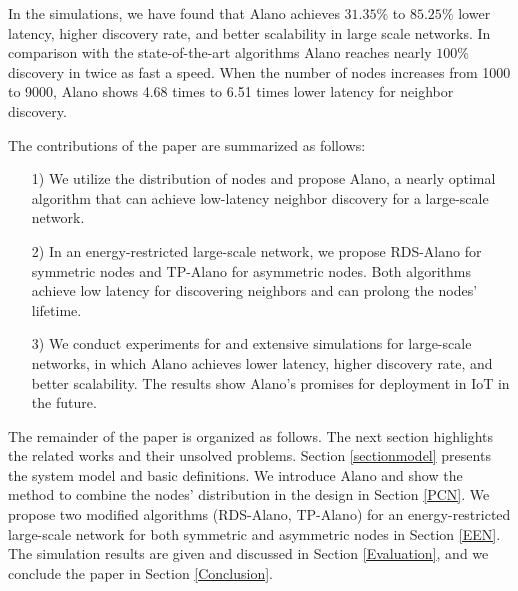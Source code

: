 In the simulations, we have found that Alano achieves $31.35\%$ to $ 85.25\%$
lower latency, higher discovery rate, and better scalability in large
scale networks. %
In comparison with the state-of-the-art algorithms \cite{you2011aloha, sun2014hello, chen2015heterogeneous, bakht2012searchlight}
Alano reaches nearly $100\%$ discovery in twice as fast a speed. 
When the number of nodes increases from 1000 to 9000, 
Alano shows 4.68 times to 6.51 times lower latency for neighbor discovery.

The contributions of the paper are summarized as follows:
\begin{itemize}
\item[1)] We utilize the distribution of nodes and propose Alano, a
nearly optimal algorithm that can achieve low-latency neighbor discovery
for a large-scale network.
\item[2)] In an energy-restricted large-scale network, we propose
RDS-Alano for symmetric nodes and TP-Alano for asymmetric nodes. Both
algorithms achieve low latency for discovering neighbors and can prolong
the nodes' lifetime.
\item[3)] We conduct experiments for %
and extensive simulations for large-scale networks, in which
Alano achieves lower latency, higher discovery rate, and better scalability.
The results show Alano's promises for deployment in
IoT in the future.
\end{itemize}

The remainder of the paper is organized as follows. The next section
highlights the related works and their unsolved problems.
Section \ref{sectionmodel} presents
the system model and basic definitions.
We introduce Alano and show the
method to combine the nodes' distribution in the design
in Section \ref{PCN}. We propose
two modified algorithms (RDS-Alano, TP-Alano) for an energy-restricted
large-scale network for both symmetric and asymmetric nodes in Section
\ref{EEN}. The simulation results are given and discussed in Section
\ref{Evaluation}, and we conclude the paper in Section \ref{Conclusion}.
